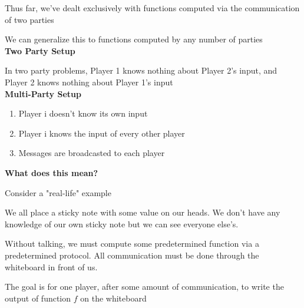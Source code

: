 \documentclass[12pt]{article}
\begin{document}
\maketitle

\par{Thus far, we've dealt exclusively with functions computed via the communication of two parties}
\\

\par{We can generalize this to functions computed by any number of parties}
\\

\textbf{Two Party Setup}
\\

\par{In two party problems, Player 1 knows nothing about Player 2's input, and Player 2 knows nothing about Player 1's
input}
\\

\textbf{Multi-Party Setup}
\\

\begin{enumerate}
  \item Player i doesn't know its own input
  \item Player i knows the input of every other player
  \item Messages are broadcasted to each player
\end{enumerate}

\textbf{What does this mean?}
\\

\par{Consider a "real-life" example}
\\

\par{We all place a sticky note with some value on our heads. We don't have any knowledge of our own sticky note but
we can see everyone else's.}
\\

\par{Without talking, we must compute some predetermined function via a predetermined protocol. All communication must
be done through the whiteboard in front of us.}
\\

\par{The goal is for one player, after some amount of communication, to write the output of function $f$ on the
whiteboard}
\\
\end{document}
